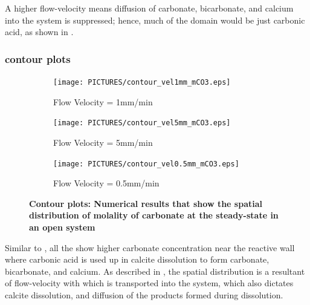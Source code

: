 A higher flow-velocity means diffusion of carbonate, bicarbonate, and calcium into the system is suppressed; hence, much of the domain would be 
just carbonic acid, as shown in . 

\subsubsection*{ contour plots} \label{sssec:contourmCO3}

\begin{figure}[!h]
\centering
    \begin{subfigure}{.5\linewidth}
        \centering
        \texttt{[image: PICTURES/contour\_vel1mm\_mCO3.eps]}
        \caption{\small Flow Velocity = 1mm/min}
        \label{fig:CO3Steady-state}       %
    \end{subfigure}%
    \hfill
    \begin{subfigure}{.5\linewidth}
        \centering
        \texttt{[image: PICTURES/contour\_vel5mm\_mCO3.eps]}
        \caption{\small Flow Velocity = 5mm/min}
        \label{fig:CO3Steady-state5mm}       %
    \end{subfigure}%
    \hfill
    \begin{subfigure}{.5\linewidth}
        \centering
        \texttt{[image: PICTURES/contour\_vel0.5mm\_mCO3.eps]}
        \caption{\small Flow Velocity = 0.5mm/min}
        \label{fig:CO3Steady-state0.5mm}       %
    \end{subfigure}%
    \caption [\DuMuX Contour plots: Numerical results that show the spatial distribution of molality of carbonate at the steady-state in an open system] {\textbf{\DuMuX Contour plots: Numerical results that show the spatial distribution of molality of carbonate at the steady-state in an open system}}
     \label{fig:contourCO3}
\end{figure}

Similar to , all the  show higher 
carbonate concentration near the reactive wall where carbonic acid is used up in calcite dissolution to form carbonate, bicarbonate, and calcium. 
As described in , the spatial distribution is a resultant of flow-velocity with which  is transported into the system, which 
also dictates calcite dissolution, and diffusion of the products formed during dissolution. 

